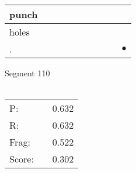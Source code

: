 \documentclass[landscape]{article}
\newcommand{\ssp}{\hspace{2pt}}
\newcommand{\mex}{\cellcolor{g}$\bullet$}
\begin{document}
\begin{tabular}{|l|p{10pt}|p{10pt}|p{10pt}|p{10pt}|p{10pt}|p{10pt}|p{10pt}|p{10pt}|p{10pt}|}
\hline
\ssp punch \ssp&\hspace{2pt}&\hspace{2pt}&\hspace{2pt}&\hspace{2pt}&\hspace{2pt}&\hspace{2pt}&\hspace{2pt}&\hspace{2pt}&\hspace{2pt}\\
\hline
\ssp holes \ssp&\hspace{2pt}&\hspace{2pt}&\hspace{2pt}&\hspace{2pt}&\hspace{2pt}&\hspace{2pt}&\hspace{2pt}&\hspace{2pt}&\hspace{2pt}\\
\hline
\ssp \cellcolor{ref8}. \ssp&\hspace{2pt}&\hspace{2pt}&\hspace{2pt}&\hspace{2pt}&\hspace{2pt}&\hspace{2pt}&\hspace{2pt}&\hspace{2pt}&\hspace{2pt}\mex\\
\hline
\end{tabular}

\vspace{6pt}
\noindent Segment 110\\\\
\noindent\begin{tabular}{lm{12pt}r}
\hline
P:&&0.632\\
R:&&0.632\\
Frag:&&0.522\\
Score:&&0.302\\
\end{tabular}

\newpage
\end{document}
